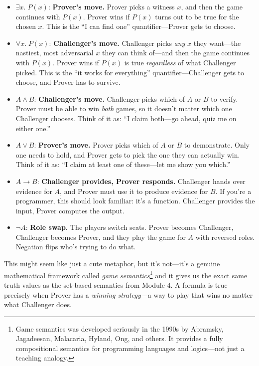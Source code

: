 \documentclass[11pt]{article}
\begin{document}
\begin{itemize}
  \item $\exists x.\; P(x)$: \textbf{Prover's move.} Prover picks a witness $x$, and then the game continues with $P(x)$. Prover wins if $P(x)$ turns out to be true for the chosen $x$. This is the ``I can find one'' quantifier---Prover gets to choose.

  \item $\forall x.\; P(x)$: \textbf{Challenger's move.} Challenger picks \emph{any} $x$ they want---the nastiest, most adversarial $x$ they can think of---and then the game continues with $P(x)$. Prover wins if $P(x)$ is true \emph{regardless} of what Challenger picked. This is the ``it works for everything'' quantifier---Challenger gets to choose, and Prover has to survive.

  \item $A \wedge B$: \textbf{Challenger's move.} Challenger picks which of $A$ or $B$ to verify. Prover must be able to win \emph{both} games, so it doesn't matter which one Challenger chooses. Think of it as: ``I claim both---go ahead, quiz me on either one.''

  \item $A \vee B$: \textbf{Prover's move.} Prover picks which of $A$ or $B$ to demonstrate. Only one needs to hold, and Prover gets to pick the one they can actually win. Think of it as: ``I claim at least one of these---let me show you which.''

  \item $A \to B$: \textbf{Challenger provides, Prover responds.} Challenger hands over evidence for $A$, and Prover must use it to produce evidence for $B$. If you're a programmer, this should look familiar: it's a function. Challenger provides the input, Prover computes the output.

  \item $\lnot A$: \textbf{Role swap.} The players switch seats. Prover becomes Challenger, Challenger becomes Prover, and they play the game for $A$ with reversed roles. Negation flips who's trying to do what.
\end{itemize}

This might seem like just a cute metaphor, but it's not---it's a genuine mathematical framework called \emph{game semantics}\footnote{Game semantics was developed seriously in the 1990s by Abramsky, Jagadeesan, Malacaria, Hyland, Ong, and others. It provides a fully compositional semantics for programming languages and logics---not just a teaching analogy.} and it gives us the exact same truth values as the set-based semantics from Module 4. A formula is true precisely when Prover has a \emph{winning strategy}---a way to play that wins no matter what Challenger does.
\end{document}
